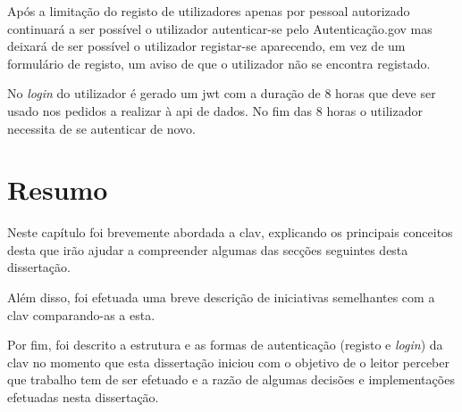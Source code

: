 Após a limitação do registo de utilizadores apenas por pessoal autorizado continuará a ser possível o utilizador 
autenticar-se pelo Autenticação.gov mas deixará de ser possível o utilizador registar-se aparecendo, em vez de 
um formulário de registo, um aviso de que o utilizador não se encontra registado.

No \textit{login} do utilizador é gerado um \acrshort{jwt} com a duração de 8 horas que deve ser usado nos pedidos 
a realizar à \acrshort{api} de dados. No fim das 8 horas o utilizador necessita de se autenticar de novo.

\section{Resumo}

Neste capítulo foi brevemente abordada a \acrshort{clav}, explicando os principais conceitos desta que irão ajudar 
a compreender algumas das secções seguintes desta dissertação.

Além disso, foi efetuada uma breve descrição de iniciativas semelhantes com a \acrshort{clav} comparando-as a esta.

Por fim, foi descrito a estrutura e as formas de autenticação (registo e \textit{login}) da \acrshort{clav} no 
momento que esta dissertação iniciou com o objetivo de o leitor perceber que trabalho tem de ser efetuado e a 
razão de algumas decisões e implementações efetuadas nesta dissertação.
